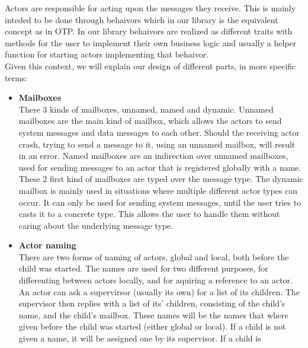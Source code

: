 \documentclass[a4paper]{article}
\begin{document}
\noindent
Actors are responsible for acting upon the messages they receive. This is mainly
inteded to be done through behaivors which in our library is the equivalent
concept as in OTP. In our library behaivors are realized as different traits
with methods for the user to implement their own business logic and usually a
helper function for starting actors implementing that behaivor.\\

\noindent
Given this context, we will explain our design of different parts, in more
specific terms:
\begin{itemize}
\item \textbf{Mailboxes}\\
  There 3 kinds of mailboxes, unnamed, named and dynamic. Unnamed mailboxes are
  the main kind of mailbox, which allows the actors to send system messages and
  data messages to each other. Should the receiving actor crash, trying to send
  a message to it, using an unnamed mailbox, will result in an error. Named
  mailboxes are an indirection over unnamed mailboxes, used for sending messages
  to an actor that is registered globally with a name. These 2 first kind of
  mailboxes are typed over the message type. The dynamic mailbox is mainly used
  in situations where multiple different actor types can occur. %
  It can only be used for sending system messages, until the user tries to casts
  it to a concrete type. This allows the user to handle them without caring
  about the underlying message type.
\item \textbf{Actor naming}\\
  There are two forms of naming of actors, global and local, both before the
  child was started. The names are used for two different purposes, for
  differenting between actors locally, and for aquiring a reference to an actor.
  An actor can ask a supervirsor (usually its own) for a list of its children.
  The supervisor then replies with a list of its' children, consisting of the
  child's name, and the child's mailbox. These names will be the names that
  where given before the child was started (either global or local). If a child
  is not given a name, it will be assigned one by its supervisor. If a child is

\end{itemize}
\end{document}
